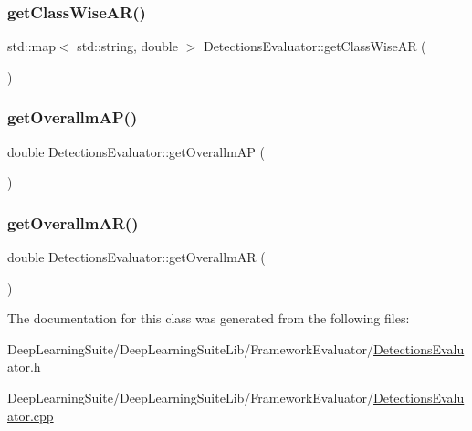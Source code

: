 \mbox{\label{class_detections_evaluator_a721ab693346076a18bf7dbdfa9a52c35}} 
\subsubsection{\texorpdfstring{get\+Class\+Wise\+A\+R()}{getClassWiseAR()}}
{\footnotesize\ttfamily std\+::map$<$ std\+::string, double $>$ Detections\+Evaluator\+::get\+Class\+Wise\+AR (\begin{DoxyParamCaption}{ }\end{DoxyParamCaption})}

\mbox{\label{class_detections_evaluator_a593969daae1eb92721cbf6b4d58e480c}} 
\subsubsection{\texorpdfstring{get\+Overallm\+A\+P()}{getOverallmAP()}}
{\footnotesize\ttfamily double Detections\+Evaluator\+::get\+Overallm\+AP (\begin{DoxyParamCaption}{ }\end{DoxyParamCaption})}

\mbox{\label{class_detections_evaluator_a33ecd969977924ce1385fc64109e619c}} 
\subsubsection{\texorpdfstring{get\+Overallm\+A\+R()}{getOverallmAR()}}
{\footnotesize\ttfamily double Detections\+Evaluator\+::get\+Overallm\+AR (\begin{DoxyParamCaption}{ }\end{DoxyParamCaption})}



The documentation for this class was generated from the following files\+:\begin{DoxyCompactItemize}
\item 
Deep\+Learning\+Suite/\+Deep\+Learning\+Suite\+Lib/\+Framework\+Evaluator/\hyperlink{_detections_evaluator_8h}{Detections\+Evaluator.\+h}\item 
Deep\+Learning\+Suite/\+Deep\+Learning\+Suite\+Lib/\+Framework\+Evaluator/\hyperlink{_detections_evaluator_8cpp}{Detections\+Evaluator.\+cpp}\end{DoxyCompactItemize}
